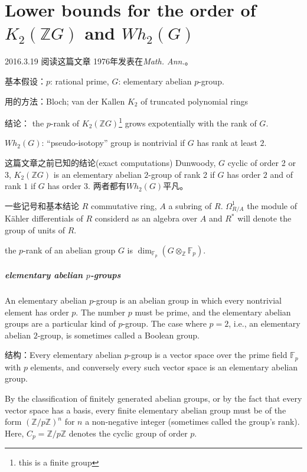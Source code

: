 \chapter{Lower bounds for the order of $K_2(\mathbb{Z}G)$ and $Wh_2(G)$} %
\label{cha:lower_bounds_for_the_order_of_}
2016.3.19 阅读这篇文章\cite{Stein1976} 1976年发表在{\em{Math. Ann.}}。

基本假设：$p$: rational prime, $G$: elementary abelian $p$-group.

用的方法：Bloch; van der Kallen  $K_2$ of truncated polynomial rings

结论：
the $p$-rank of $K_2(\mathbb{Z}G)$\footnote{this is a finite group} grows expotentially with the rank of $G$.

$Wh_2(G)$: ``pseudo-isotopy'' group is nontrivial if $G$ has rank at least $2$.


这篇文章之前已知的结论(exact computations)
Dunwoody, $G$ cyclic of order 2 or 3, {\color{green} $K_2(\mathbb{Z}G)$ is an elementary abelian $2$-group of rank 2 if $G$ has order $2$ and of rank $1$ if $G$ has order $3$}. 两者都有$Wh_2(G)$平凡。


一些记号和基本结论
$R$ commutative ring, $A$ a subring of $R$.
$\Omega_{R/A}^1$ the module of K\"{a}hler differentials of $R$ considerd as an algebra over $A$ and $R^*$ will denote the group of units of $R$.

the $p$-rank of an abelian group $G$ is $\dim_{\mathbb{F}_p}(G\otimes_\mathbb{Z} \mathbb{F}_p)$.

\paragraph{elementary abelian $p$-groups} %
\label{par:elementary_}An elementary abelian $p$-group is an abelian group in which every nontrivial element has order $p$. The number $p$ must be prime, and the elementary abelian groups are a particular kind of $p$-group. The case where $p = 2$, i.e., an elementary abelian $2$-group, is sometimes called a Boolean group.

结构：Every elementary abelian $p$-group is a vector space over the prime field $\mathbb{F}_p$ with $p$ elements, and conversely every such vector space is an elementary abelian group.

By the classification of finitely generated abelian groups, or by the fact that every vector space has a basis, every finite elementary abelian group must be of the form $(\mathbb{Z}/p \mathbb{Z})^n$ for $n$ a non-negative integer (sometimes called the group's rank). Here, $C_p=\mathbb{Z}/p \mathbb{Z}$ denotes the cyclic group of order $p$.

